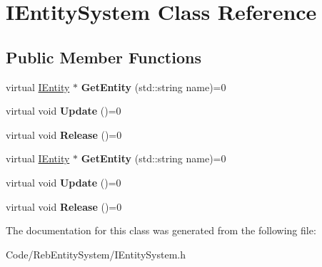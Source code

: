 \hypertarget{class_i_entity_system}{}\section{I\+Entity\+System Class Reference}
\label{class_i_entity_system}
\subsection*{Public Member Functions}
\begin{DoxyCompactItemize}
\item 
virtual \hyperlink{class_i_entity}{I\+Entity} $\ast$ {\bfseries Get\+Entity} (std\+::string name)=0\hypertarget{class_i_entity_system_a97526775005742677e46197a37398062}{}\label{class_i_entity_system_a97526775005742677e46197a37398062}

\item 
virtual void {\bfseries Update} ()=0\hypertarget{class_i_entity_system_a3870bc5127ae59d8af559365191b2cc1}{}\label{class_i_entity_system_a3870bc5127ae59d8af559365191b2cc1}

\item 
virtual void {\bfseries Release} ()=0\hypertarget{class_i_entity_system_a39857e5524479215522707c4157b387f}{}\label{class_i_entity_system_a39857e5524479215522707c4157b387f}

\item 
virtual \hyperlink{class_i_entity}{I\+Entity} $\ast$ {\bfseries Get\+Entity} (std\+::string name)=0\hypertarget{class_i_entity_system_a97526775005742677e46197a37398062}{}\label{class_i_entity_system_a97526775005742677e46197a37398062}

\item 
virtual void {\bfseries Update} ()=0\hypertarget{class_i_entity_system_a3870bc5127ae59d8af559365191b2cc1}{}\label{class_i_entity_system_a3870bc5127ae59d8af559365191b2cc1}

\item 
virtual void {\bfseries Release} ()=0\hypertarget{class_i_entity_system_a39857e5524479215522707c4157b387f}{}\label{class_i_entity_system_a39857e5524479215522707c4157b387f}

\end{DoxyCompactItemize}


The documentation for this class was generated from the following file\+:\begin{DoxyCompactItemize}
\item 
Code/\+Reb\+Entity\+System/I\+Entity\+System.\+h\end{DoxyCompactItemize}
